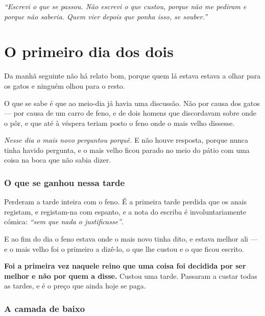 \documentclass[livro.tex]{subfiles}
\begin{document}
\medskip

\emph{``Escrevi o que se passou. Não escrevi o que custou, porque não me pediram e porque não
saberia. Quem vier depois que ponha isso, se souber.''}


\chapter{O primeiro dia dos dois}

Da manhã seguinte não há relato bom, porque quem lá estava estava a olhar para os gatos e ninguém
olhou para o resto.

\medskip

O que se sabe é que ao meio-dia já havia uma discussão. Não por causa dos gatos --- por causa de
um carro de feno, e de dois homens que discordavam sobre onde o pôr, e que até à véspera teriam
posto o feno onde o mais velho dissesse.

\medskip

\emph{Nesse dia o mais novo perguntou porquê.} E não houve resposta, porque nunca tinha havido
pergunta, e o mais velho ficou parado no meio do pátio com uma coisa na boca que não sabia dizer.

\subsection*{O que se ganhou nessa tarde}

Perderam a tarde inteira com o feno. É a primeira tarde perdida que os anais registam, e
registam-na com espanto, e a nota do escriba é involuntariamente cómica: \emph{``sem que nada o
justificasse''}.

\medskip

E ao fim do dia o feno estava onde o mais novo tinha dito, e estava melhor ali --- e o mais velho
foi o primeiro a dizê-lo, o que lhe custou e o que ficou escrito.

\medskip

\textbf{Foi a primeira vez naquele reino que uma coisa foi decidida por ser melhor e não por quem
a disse.} Custou uma tarde. Passaram a custar todas as tardes, e é o preço que ainda hoje se paga.

\subsection*{A camada de baixo}
\end{document}
